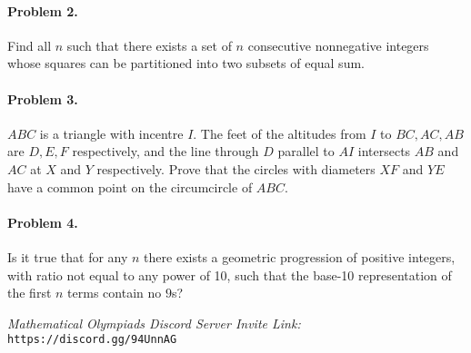 \documentclass[11pt]{article}
\begin{document}
	\paragraph{Problem 2.} Find all $n$ such that there exists a set of $n$ consecutive nonnegative integers whose squares can be partitioned into two subsets of equal sum.

	\paragraph{Problem 3.} $ABC$ is a triangle with incentre $I$. The feet of the altitudes from $I$ to $BC, AC, AB$ are $D, E, F$ respectively, and the line through $D$ parallel to $AI$ intersects \(AB\) and \(AC\) at \(X\) and \(Y\) respectively. Prove that the circles with diameters $XF$ and $YE$ have a common point on the circumcircle of $ABC.$\

	\paragraph{Problem 4.} Is it true that for any \(n\) there exists a geometric progression of positive integers, with ratio not equal to any power of 10, such that the base-10 representation of the first \(n\) terms contain no $9$s?
	
	\vfill
	
	\noindent \makebox[\linewidth]{\rule{\textwidth}{0.4pt}}	
	
	\noindent \textit{Mathematical Olympiads Discord Server Invite Link:} \texttt{https://discord.gg/94UnnAG}
		
		
		
		
	
	
\end{document}
